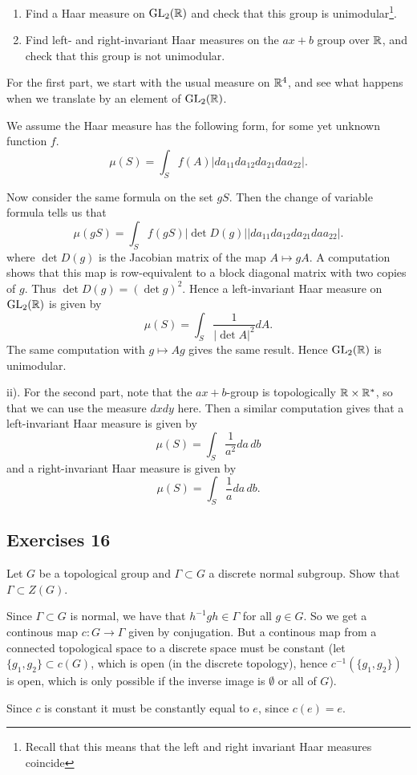 \documentclass[11pt, english]{article}
\begin{document}
\begin{exc}
  \begin{enumerate}
  \item Find a Haar measure on $\operatorname{GL}_2(\mathbb{R})$ and check that this group is unimodular\footnote{Recall that this means that the left and right invariant Haar measures coincide}.
\item Find left- and right-invariant Haar measures on the $ax+b$ group over $\mathbb{R}$, and check that this group is not unimodular.
  \end{enumerate}
\end{exc}
\begin{sol}
For the first part, we start with the usual measure on $\mathbb{R}^4$, and see what happens when we translate by an element of $\operatorname{GL}_2(\mathbb{R})$. 

We assume the Haar measure has the following form, for some yet unknown function $f$.
$$
\mu(S) = \int_S f(A) \lvert da_{11} d a_{12} da_{21} da a_{22} \rvert.
$$

Now consider the same formula on the set $gS$. Then the change of variable formula tells us that
$$
\mu(gS) = \int_S f(gS) \lvert \det D(g) \rvert \lvert da_{11} d a_{12} da_{21} da a_{22} \rvert.
$$
where $\det D(g)$ is the Jacobian matrix of the map $A \mapsto gA$. A computation shows that this map is row-equivalent to a block diagonal matrix with two copies of $g$. Thus $\det D(g) = (\det g)^2$. Hence a left-invariant Haar measure on $\operatorname{GL}_2(\mathbb{R})$ is given by
$$
\mu(S) = \int_S \frac{1}{\lvert \det A\rvert ^2} dA.
$$
The same computation with $g \mapsto Ag$ gives the same result. Hence $\operatorname{GL}_2(\mathbb{R})$ is unimodular.

ii). For the second part, note that the $ax+b$-group is topologically $\mathbb{R} \times \mathbb{R}^\ast$, so that we can use the measure $dxdy$ here. Then a similar computation gives that a left-invariant Haar measure is given by
$$
\mu(S) = \int_S \frac{1}{a^2} da\, db
$$
and a right-invariant Haar measure is given by
$$
\mu(S) = \int_S \frac{1}{a} da\, db.
$$
\end{sol}

\subsection{Exercises 16}

\begin{exc}[Exc 2]
Let $G$ be a topological group and $\Gamma \subset G$ a discrete normal subgroup. Show that $\Gamma \subset Z(G)$.
\end{exc}
\begin{sol}
Since $\Gamma \subset G$ is normal, we have that $h^{-1}gh \in \Gamma$ for all $g \in G$. So we get a continous map $c:G \to \Gamma$ given by conjugation. But a continous map from a connected topological space to a discrete space must be constant (let $\{g_1, g_2\} \subset c(G)$, which is open (in the discrete topology), hence $c^{-1}(\{ g_1,g_2 \})$ is open, which is only possible if  the inverse image is $\emptyset$ or all of $G$). 

Since $c$ is constant it must be constantly equal to $e$, since $c(e)=e$.
\end{sol}
\end{document}
